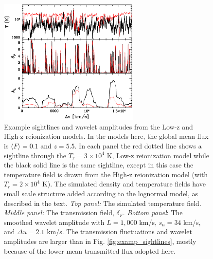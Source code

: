 \begin{figure}
\bc
\includegraphics[width=7cm]{f13.eps}
\caption{Example sightlines and wavelet amplitudes from the Low-z and High-z reionization models. In the models here, the global mean flux
is $\langle F \rangle=0.1$ and $z=5.5$. In each panel the red dotted
line shows a sightline through the $T_r=3 \times 10^4$ K, Low-z reionization model while the black solid line is the same sightline,
except in this case the temperature field is drawn from the
High-z reionization model (with $T_r = 2 \times 10^4$ K). The simulated density and temperature fields have small scale structure
added according to the lognormal model, as described in the text. {\it Top panel:} The simulated temperature field. {\it Middle panel:}
The transmission field, $\delta_F$. {\it Bottom panel}: The smoothed wavelet amplitude with $L=1,000$ km/s, $s_n=34$ km/s, and
$\Delta u=2.1$ km/s. The transmission fluctuations and wavelet amplitudes are larger than in Fig. \ref{fig:examp_sightlines}, mostly because
of the lower mean transmitted flux adopted here.}
\label{fig:examp_wave}
\ec
\end{figure}


